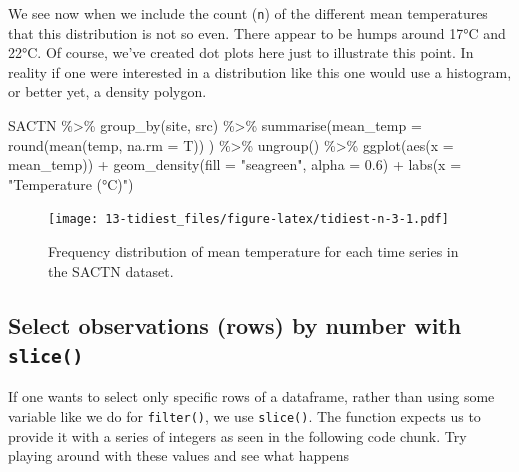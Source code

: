 \documentclass[
]{book}
\newenvironment{Shaded}{\begin{snugshade}}{\end{snugshade}}
\newcommand{\AttributeTok}[1]{\textcolor[rgb]{0.77,0.63,0.00}{#1}}
\newcommand{\FloatTok}[1]{\textcolor[rgb]{0.00,0.00,0.81}{#1}}
\newcommand{\FunctionTok}[1]{\textcolor[rgb]{0.00,0.00,0.00}{#1}}
\newcommand{\NormalTok}[1]{#1}
\newcommand{\SpecialCharTok}[1]{\textcolor[rgb]{0.00,0.00,0.00}{#1}}
\newcommand{\StringTok}[1]{\textcolor[rgb]{0.31,0.60,0.02}{#1}}
\begin{document}
We see now when we include the count (\texttt{n}) of the different mean temperatures that this distribution is not so even. There appear to be humps around 17°C and 22°C. Of course, we've created dot plots here just to illustrate this point. In reality if one were interested in a distribution like this one would use a histogram, or better yet, a density polygon.

\begin{Shaded}
\begin{Highlighting}[]
\NormalTok{SACTN }\SpecialCharTok{\%\textgreater{}\%} 
  \FunctionTok{group\_by}\NormalTok{(site, src) }\SpecialCharTok{\%\textgreater{}\%} 
  \FunctionTok{summarise}\NormalTok{(}\AttributeTok{mean\_temp =} \FunctionTok{round}\NormalTok{(}\FunctionTok{mean}\NormalTok{(temp, }\AttributeTok{na.rm =}\NormalTok{ T))}
\NormalTok{            ) }\SpecialCharTok{\%\textgreater{}\%} 
  \FunctionTok{ungroup}\NormalTok{() }\SpecialCharTok{\%\textgreater{}\%} 
  \FunctionTok{ggplot}\NormalTok{(}\FunctionTok{aes}\NormalTok{(}\AttributeTok{x =}\NormalTok{ mean\_temp)) }\SpecialCharTok{+}
  \FunctionTok{geom\_density}\NormalTok{(}\AttributeTok{fill =} \StringTok{"seagreen"}\NormalTok{, }\AttributeTok{alpha =} \FloatTok{0.6}\NormalTok{) }\SpecialCharTok{+}
  \FunctionTok{labs}\NormalTok{(}\AttributeTok{x =} \StringTok{"Temperature (°C)"}\NormalTok{)}
\end{Highlighting}
\end{Shaded}

\begin{figure}
\centering
\texttt{[image: 13-tidiest\_files/figure-latex/tidiest-n-3-1.pdf]}
\caption{\label{fig:tidiest-n-3}Frequency distribution of mean temperature for each time series in the SACTN dataset.}
\end{figure}

\hypertarget{select-observations-rows-by-number-with-slice}{%
\subsection{\texorpdfstring{Select observations (rows) by number with \texttt{slice()}}{Select observations (rows) by number with slice()}}\label{select-observations-rows-by-number-with-slice}}

If one wants to select only specific rows of a dataframe, rather than using some variable like we do for \texttt{filter()}, we use \texttt{slice()}. The function expects us to provide it with a series of integers as seen in the following code chunk. Try playing around with these values and see what happens
\end{document}
